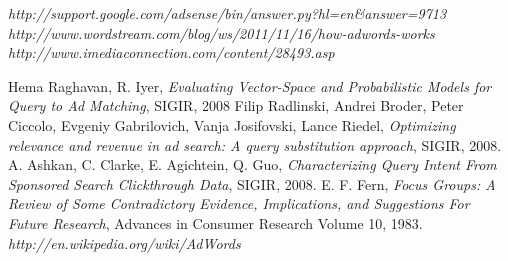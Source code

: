 \documentclass[letterpaper,11pt]{article}
\begin{document}
\begin{thebibliography}{9}
\emph{http://support.google.com/adsense/bin/answer.py?hl=en\&answer=9713}
 \emph{http://www.wordstream.com/blog/ws/2011/11/16/how-adwords-works}
\emph{http://www.imediaconnection.com/content/28493.asp}

Hema Raghavan, R. Iyer, 
\emph{Evaluating Vector-Space and Probabilistic Models for
Query to Ad Matching}, SIGIR, 2008
Filip Radlinski, Andrei Broder, Peter Ciccolo, Evgeniy Gabrilovich, Vanja Josifovski, Lance Riedel,
\emph{Optimizing relevance and
revenue in ad search: A query substitution approach}, SIGIR, 2008.
A. Ashkan, C. Clarke, E. Agichtein, Q. Guo, \emph{Characterizing Query Intent From
Sponsored Search Clickthrough Data}, SIGIR, 2008.
E. F. Fern, \emph{Focus Groups: A Review of Some Contradictory Evidence, Implications, and Suggestions For Future Research}, Advances in Consumer Research Volume 10, 1983.
\emph{http://en.wikipedia.org/wiki/AdWords}
\end{thebibliography}

    
\end{document}
